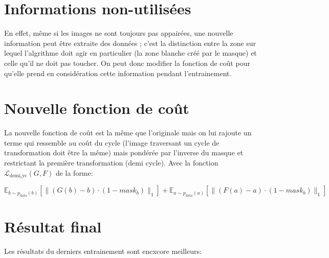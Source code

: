 \section{Informations non-utilisées}
En effet, même si les images ne sont toujours pas appairées, une nouvelle information peut être extraite des données ; c'est la distinction entre la zone sur lequel l'algrithme doit agir en particulier (la zone blanche créé par le masque) et celle qu'il ne doit pas toucher. On peut donc modifier la fonction de coût pour qu'elle prend en considération cette information pendant l'entrainement.

\section{Nouvelle fonction de coût}
La nouvelle fonction de coût est la même que l'originale mais on lui rajoute un terme qui ressemble au coût du cycle (l'image traversant un cycle de transformation doit être la même) mais pondérée par l'inverse du masque et restrictant la première transformation (demi cycle). Avec la fonction $\mathcal{L}_{\mathrm{demi_cyc}}(G, F)$ de la forme:

$$\mathbb{E}_{b \sim p_{\text {data}}(b)}\left[\|(G(b)-b)\cdot (1 - mask_b)\|_{1}\right]+ \mathbb{E}_{a \sim p_{\text {data}}(a)}\left[\|(F(a)-a)\cdot (1 - mask_b)\|_{1}\right]$$

\section{Résultat final}

Les résultats du derniers entrainement sont encxcore meilleurs:

